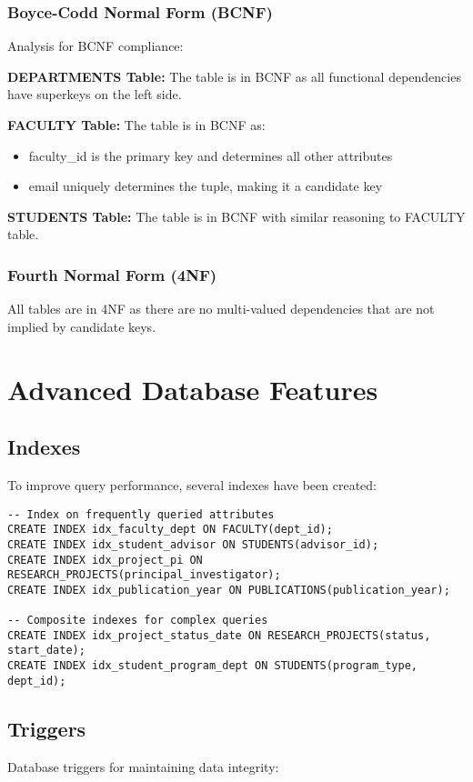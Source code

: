 \documentclass[12pt,a4paper]{article}
\begin{document}
\subsubsection{Boyce-Codd Normal Form (BCNF)}
Analysis for BCNF compliance:

\textbf{DEPARTMENTS Table:}
The table is in BCNF as all functional dependencies have superkeys on the left side.

\textbf{FACULTY Table:}
The table is in BCNF as:
\begin{itemize}
    \item faculty\_id is the primary key and determines all other attributes
    \item email uniquely determines the tuple, making it a candidate key
\end{itemize}

\textbf{STUDENTS Table:}
The table is in BCNF with similar reasoning to FACULTY table.

\subsubsection{Fourth Normal Form (4NF)}
All tables are in 4NF as there are no multi-valued dependencies that are not implied by candidate keys.

\section{Advanced Database Features}

\subsection{Indexes}
To improve query performance, several indexes have been created:

\begin{lstlisting}[style=sqlstyle]
-- Index on frequently queried attributes
CREATE INDEX idx_faculty_dept ON FACULTY(dept_id);
CREATE INDEX idx_student_advisor ON STUDENTS(advisor_id);
CREATE INDEX idx_project_pi ON RESEARCH_PROJECTS(principal_investigator);
CREATE INDEX idx_publication_year ON PUBLICATIONS(publication_year);

-- Composite indexes for complex queries
CREATE INDEX idx_project_status_date ON RESEARCH_PROJECTS(status, start_date);
CREATE INDEX idx_student_program_dept ON STUDENTS(program_type, dept_id);
\end{lstlisting}

\subsection{Triggers}
Database triggers for maintaining data integrity:
\end{document}
